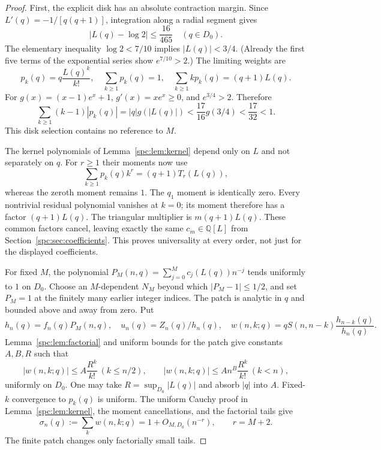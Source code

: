 \documentclass[11pt,letterpaper]{article}
\theoremstyle{definition}\newtheorem{definition}[theorem]{Definition}
\theoremstyle{remark}\newtheorem{remark}[theorem]{Remark}
\newcommand{\Q}{\mathbb Q}
\begin{document}
\begin{proof}
First, the explicit disk has an absolute contraction margin. Since
$L'(q)=-1/[q(q+1)]$, integration along a radial segment gives
\[
 |L(q)-\log2|\le\frac{16}{465}\quad(q\in D_0).
\]
The elementary inequality $\log2<7/10$ implies $|L(q)|<3/4$. (Already the first five terms of the exponential series show $e^{7/10}>2$.) The limiting weights are
\begin{equation}\label{spc:eq:pkq}
 p_k(q)=q\frac{L(q)^k}{k!},\quad
 \sum_{k\ge1}p_k(q)=1,\quad
 \sum_{k\ge1}kp_k(q)=(q+1)L(q).
\end{equation}
For $g(x)=(x-1)e^x+1$, $g'(x)=xe^x\ge0$, and $e^{3/4}>2$. Therefore
\begin{equation}\label{spc:eq:diskcontract}
 \sum_{k\ge1}(k-1)|p_k(q)|
 =|q|g(|L(q)|)<\frac{17}{16}g(3/4)<\frac{17}{32}<1.
\end{equation}
This disk selection contains no reference to $M$.

The kernel polynomials of Lemma~\ref{spc:lem:kernel} depend only on $L$ and not separately on $q$. For $r\ge1$ their moments now use
\begin{equation}\label{spc:eq:markedmoments}
 \sum_{k\ge1}p_k(q)k^r=(q+1)T_r(L(q)),
\end{equation}
whereas the zeroth moment remains $1$. The $q_1$ moment is identically zero. Every nontrivial residual polynomial vanishes at $k=0$; its moment therefore has a factor $(q+1)L(q)$. The triangular multiplier is $m(q+1)L(q)$. These common factors cancel, leaving exactly the same $c_m\in\Q[L]$ from Section~\ref{spc:sec:coefficients}. This proves universality at every order, not just for the displayed coefficients.

For fixed $M$, the polynomial
$P_M(n,q)=\sum_{j=0}^Mc_j(L(q))n^{-j}$ tends uniformly to $1$ on $D_0$. Choose an $M$-dependent $N_M$ beyond which $|P_M-1|\le1/2$, and set $P_M=1$ at the finitely many earlier integer indices. The patch is analytic in $q$ and bounded above and away from zero. Put
\[
 h_n(q)=f_n(q)P_M(n,q),\quad u_n(q)=Z_n(q)/h_n(q),\quad
 w(n,k;q)=qS(n,n-k)\frac{h_{n-k}(q)}{h_n(q)}.
\]
Lemma~\ref{spc:lem:factorial} and uniform bounds for the patch give constants $A,B,R$ such that
\begin{equation}\label{spc:eq:complexbounds}
 |w(n,k;q)|\le A\frac{R^k}{k!}\ (k\le n/2),\qquad
 |w(n,k;q)|\le An^B\frac{R^k}{k!}\ (k<n),
\end{equation}
uniformly on $D_0$. One may take $R=\sup_{D_0}|L(q)|$ and absorb $|q|$ into $A$. Fixed-$k$ convergence to $p_k(q)$ is uniform. The uniform Cauchy proof in Lemma~\ref{spc:lem:kernel}, the moment cancellations, and the factorial tails give
\begin{equation}\label{spc:eq:complexrow}
 \sigma_n(q):=\sum_kw(n,k;q)=1+O_{M,D_0}(n^{-r}),\qquad r=M+2.
\end{equation}
The finite patch changes only factorially small tails.


\end{proof}
\end{document}
